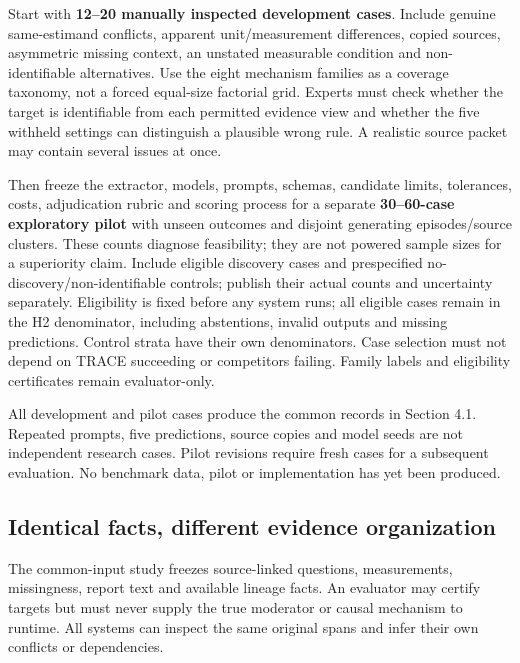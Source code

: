 \documentclass[11pt,a4paper]{article}
\begin{document}
Start with \textbf{12--20 manually inspected development cases}. Include
genuine same-estimand conflicts, apparent unit/measurement differences,
copied sources, asymmetric missing context, an unstated measurable
condition and non-identifiable alternatives. Use the eight mechanism
families as a coverage taxonomy, not a forced equal-size factorial grid.
Experts must check whether the target is identifiable from each
permitted evidence view and whether the five withheld settings can
distinguish a plausible wrong rule. A realistic source packet may
contain several issues at once.

Then freeze the extractor, models, prompts, schemas, candidate limits,
tolerances, costs, adjudication rubric and scoring process for a
separate \textbf{30--60-case exploratory pilot} with unseen outcomes and
disjoint generating episodes/source clusters. These counts diagnose
feasibility; they are not powered sample sizes for a superiority claim.
Include eligible discovery cases and prespecified
no-discovery/non-identifiable controls; publish their actual counts and
uncertainty separately. Eligibility is fixed before any system runs; all
eligible cases remain in the H2 denominator, including abstentions,
invalid outputs and missing predictions. Control strata have their own
denominators. Case selection must not depend on TRACE succeeding or
competitors failing. Family labels and eligibility certificates remain
evaluator-only.

All development and pilot cases produce the common records in Section
4.1. Repeated prompts, five predictions, source copies and model seeds
are not independent research cases. Pilot revisions require fresh cases
for a subsequent evaluation. No benchmark data, pilot or implementation
has yet been produced.

\subsection{Identical facts, different evidence
organization}\label{identical-facts-different-evidence-organization}

The common-input study freezes source-linked questions, measurements,
missingness, report text and available lineage facts. An evaluator may
certify targets but must never supply the true moderator or causal
mechanism to runtime. All systems can inspect the same original spans
and infer their own conflicts or dependencies.
\end{document}
